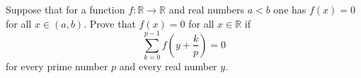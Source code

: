 \documentclass{article}
\begin{document}
\setlength{\parindent}{0pt}
Suppose that for a function $f:\mathbb{R}\to\mathbb{R}$ and real numbers $a<b$ one has $f(x)=0$ for all $x\in(a,b)$. Prove that $f(x)=0$ for all $x\in\mathbb{R}$ if$$\sum_{k=0}^{p-1}f\left(y+\frac kp\right)=0$$for every prime number $p$ and every real number $y$.
\end{document}
